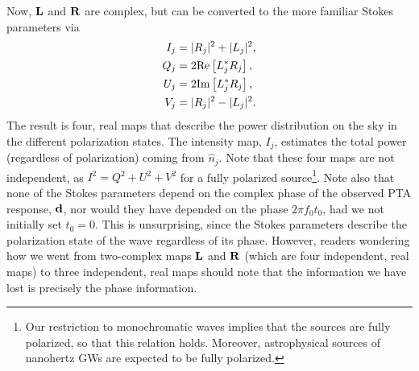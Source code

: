 \documentclass[%
 reprint,
nofootinbib,
 amsmath,amssymb,
 aps,
]{revtex4-2}
\begin{document}
Now, ${\bf L}$ and ${\bf R}$ are complex, but can be converted to the more familiar Stokes parameters via
\begin{align}
    I_j &= |R_j|^2 + |L_j|^2,\\
    Q_j &= 2 {\rm Re}\left[L_j^* R_j\right], \\
    U_j &= 2 {\rm Im}\left[L_j^* R_j\right], \\
    V_j &= |R_j|^2 - |L_j|^2.
\end{align}
The result is four, real maps that describe the power distribution on the sky in the different polarization states. The intensity map, $I_j$, estimates the total power (regardless of polarization) coming from $\hat{n}_j$. Note that these four maps are not independent, as $I^2 = Q^2 + U^2 + V^2$ for a fully polarized source\footnote{Our restriction to monochromatic waves implies that the sources are fully polarized, so that this relation holds. Moreover, astrophysical sources of nanohertz GWs are expected to be fully polarized.}. Note also that none of the Stokes parameters depend on the complex phase of the observed PTA response, ${\bf d}$, nor would they have depended on the phase $2 \pi f_0 t_0$, had we not initially set $t_0 = 0$. This is unsurprising, since the Stokes parameters describe the polarization state of the wave regardless of its phase. However, readers wondering how we went from two-complex maps ${\bf L}$ and ${\bf R}$ (which are four independent, real maps) to three independent, real maps should note that the information we have lost is precisely the phase information. 
\end{document}
